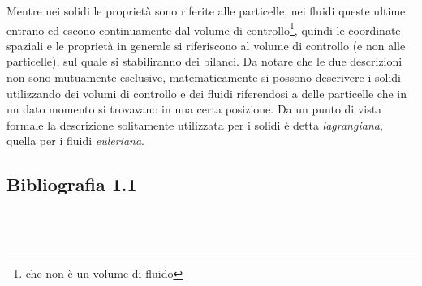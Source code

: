 Mentre nei solidi le proprietà sono riferite alle particelle, nei fluidi queste ultime entrano ed escono continuamente dal volume di controllo\footnote{che non è un volume di fluido}, quindi le coordinate spaziali e le proprietà in generale si riferiscono al volume di controllo (e non alle particelle), sul quale si stabiliranno dei bilanci.
Da notare che le due descrizioni non sono mutuamente esclusive, matematicamente si possono descrivere i solidi utilizzando dei volumi di controllo e dei fluidi riferendosi a delle particelle che in un dato momento si trovavano in una certa posizione. 
Da un punto di vista formale la descrizione solitamente utilizzata per i solidi è detta \textit{lagrangiana}, quella per i fluidi \textit{euleriana}.
%
\subsection*{Bibliografia 1.1}
\cite[Cap.\ 1.1, 4.1]{CengelCimbala}\\
\cite[Cap.\ 1.1]{LuchiniQuadrio}\\
\cite[Cap.\ 1.1]{PnueliGutfinger}